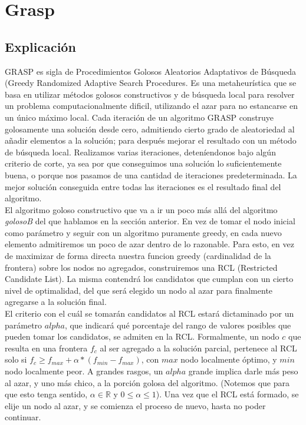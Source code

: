 \section{Grasp}

\subsection{Explicación}
GRASP es sigla de Procedimientos Golosos Aleatorios Adaptativos de Búsqueda (Greedy Randomized Adaptive Search Procedures. Es una metaheurística que se basa en utilizar métodos golosos constructivos y de búsqueda local para resolver un problema computacionalmente dificil, utilizando el azar para no estancarse en un único máximo local. Cada iteración de un algoritmo GRASP construye golosamente una solución desde cero, admitiendo cierto grado de aleatoriedad al añadir elementos a la solución; para después mejorar el resultado con un método de búsqueda local. Realizamos varias iteraciones, deteníendonos bajo algún criterio de corte, ya sea por que conseguimos una solución lo suficientemente buena, o porque nos pasamos de una cantidad de iteraciones predeterminada. La mejor solución conseguida entre todas las iteraciones es el resultado final del algoritmo. \cite{paper_grasp} \\

El algoritmo goloso constructivo que va a ir un poco más allá del algoritmo \textit{golosoB} del que hablamos en la sección anterior. En vez de tomar el nodo inicial como parámetro y seguir con un algoritmo puramente greedy, en cada nuevo elemento admitiremos un poco de azar dentro de lo razonable. Para esto, en vez de maximizar de forma directa nuestra funcion greedy (cardinalidad de la frontera) sobre los nodos no agregados, construiremos una RCL (Restricted Candidate List). La misma contendrá los candidatos que cumplan con un cierto nivel de optimalidad, del que será elegido un nodo al azar para finalmente agregarse a la solución final. \\

El criterio con el cuál se tomarán candidatos al RCL estará dictaminado por un parámetro $alpha$, que indicará qué porcentaje del rango de valores posibles que pueden tomar los candidatos, se admiten en la RCL. Formalmente, un nodo $c$ que resulta en una frontera $f_c$ al ser agregado a la solución parcial, pertenece al RCL solo si $f_c \geq f_{max} + \alpha * (f_{min} - f_{max})$, con $max$ nodo localmente óptimo, y $min$ nodo localmente peor. A grandes rasgos, un $alpha$ grande implica darle más peso al azar, y uno más chico, a la porción golosa del algoritmo. (Notemos que para que esto tenga sentido, $\alpha \in \mathbb{R}$ y $0 \leq \alpha \leq 1$). Una vez que el RCL está formado, se elije un nodo al azar, y se comienza el proceso de nuevo, hasta no poder continuar. \\

